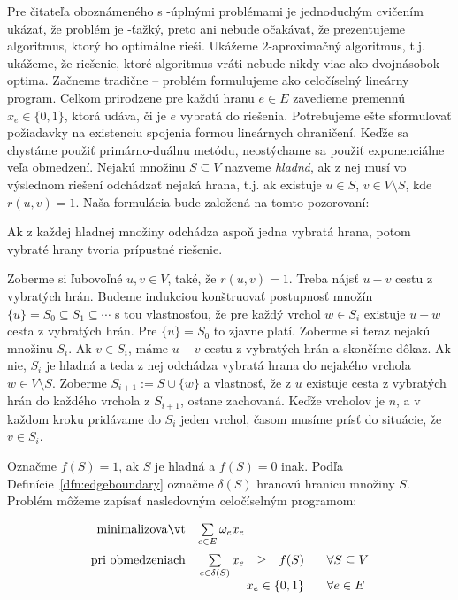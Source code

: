\noindent
Pre čitateľa oboznámeného s \NP-úplnými problémami je jednoduchým cvičením ukázať, že problém
\minsforest je \NP-ťažký, preto ani nebude očakávať, že prezentujeme algoritmus, ktorý ho optimálne rieši.
Ukážeme 2-aproximačný algoritmus, t.j. ukážeme, že riešenie, ktoré algoritmus vráti nebude nikdy viac 
ako dvojnásobok optima. Začneme tradične -- problém formulujeme ako celočíselný lineárny program. Celkom
prirodzene pre každú hranu $e\in E$ zavedieme premennú $x_e\in\{0,1\}$, ktorá udáva, či je $e$ 
vybratá do riešenia. Potrebujeme ešte sformulovať požiadavky na existenciu spojenia formou lineárnych
ohraničení. Keďže sa chystáme použiť primárno-duálnu metódu, neostýchame sa použiť exponenciálne veľa
obmedzení. Nejakú množinu $S\subseteq V$ nazveme {\em hladná}, ak 
z nej musí vo výslednom riešení odchádzať nejaká hrana, t.j. ak existuje $u\in S$, $v\in V\setminus S$,
kde $r(u,v)=1$. 
Naša formulácia bude založená na tomto pozorovaní:

\begin{lema}
  Ak z každej hladnej množiny odchádza aspoň jedna vybratá hrana, potom vybraté hrany tvoria 
  prípustné riešenie.
\end{lema}

\begin{dokaz}
  Zoberme si ľubovoľné $u,v\in V$, také, že $r(u,v)=1$. Treba nájsť $u-v$ cestu z vybratých hrán.
  Budeme indukciou konštruovať postupnosť množín $\{u\}=S_0\subseteq S_1\subseteq\cdots$ s tou vlastnosťou, že
  pre každý vrchol $w\in S_i$ existuje $u-w$ cesta z vybratých hrán. 
  Pre $\{u\}=S_0$ to zjavne platí. Zoberme si teraz nejakú množinu $S_i$. Ak $v\in S_i$, máme $u-v$ cestu
  z vybratých hrán a skončíme dôkaz. Ak nie, $S_i$ je hladná a teda z nej odchádza vybratá hrana do nejakého vrchola 
  $w\in V\setminus S$. Zoberme $S_{i+1}:=S\cup\{w\}$ a vlastnosť, že z $u$ existuje cesta z vybratých hrán do každého
  vrchola z $S_{i+1}$, ostane zachovaná. Keďže vrcholov je $n$, 
  a v každom kroku pridávame do $S_i$ jeden vrchol, časom musíme prísť do situácie, že $v\in S_i$.
\end{dokaz}

\noindent
Označme $f(S)=1$, ak $S$ je hladná a $f(S)=0$ inak. Podľa Definície~\ref{dfn:edgeboundary} označme $\delta(S)$
hranovú hranicu množiny $S$. Problém \minsforest môžeme zapísať nasledovným celočíselným programom:

\begin{equation}
  \label{eq:minsforest:ILP}
\begin{array}{rrcll}
  {\rm minimalizovať}     & \multicolumn{1}{l}{\sum\limits_{e\in E}\omega_ex_e}\\[3ex]
  {\rm pri\ obmedzeniach} & \sum\limits_{e\in\delta(S)}x_e&\ge&f(S)& \;\;\;\forall S\subseteq V\\
                          & \multicolumn{3}{r}{x_e\in\{0,1\}}& \;\;\;\forall e\in E\\
\end{array}
\end{equation}

